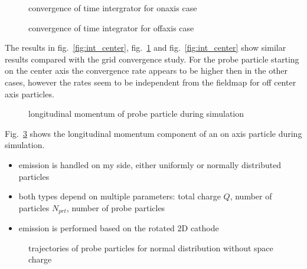 \begin{center}
\begin{figure}[H]
  
  \caption{convergence of time intergrator for onaxis case}
  \label{fig:int_on}
\end{figure}
\end{center}

\begin{center}
\begin{figure}[H]
  
  \caption{convergence of time integrator for offaxis case}
  \label{fig:int_off}
\end{figure}
\end{center}
\begin{center}

The results in fig.~\ref{fig:int_center}, fig.~\ref{fig:int_on} and fig.~\ref{fig:int_center} show similar results compared with the grid convergence study. For the probe particle starting on the center axis the convergence rate appears to be higher then in the other cases, however the rates seem to be independent from the fieldmap for off center axis particles.

\begin{figure}[H]
  
  \caption{longitudinal momentum of probe particle during simulation}
  \label{fig:momentum}
\end{figure}
\end{center}

Fig.~\ref{fig:momentum} shows the longitudinal momentum component of an on axis particle during simulation.

\begin{itemize}
  \item emission is handled on my side, either uniformly or normally distributed particles
  \item both types depend on multiple parameters: total charge $Q$, number of particles $N_{prt}$, number of probe particles
  \item emission is performed based on the rotated 2D cathode
\end{itemize}

\begin{center}
\begin{figure}[H]
  
  \caption{trajectories of probe particles for normal distribution without space charge}
  \label{fig:normal}
\end{figure}
\end{center}

